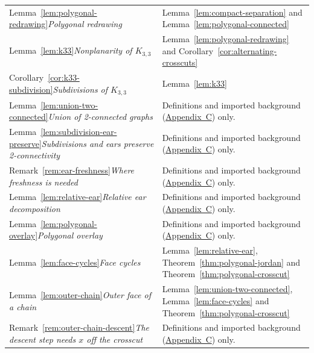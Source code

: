 \documentclass[11pt]{article}
\theoremstyle{mainplain}
\theoremstyle{mainroman}
\theoremstyle{definition}
\numberwithin{equation}{section}
\begin{document}
\begin{longtable}{@{}>{\raggedright\arraybackslash}p{}>{\raggedright\arraybackslash}p{}@{}}
Lemma~\ref{lem:polygonal-redrawing}\newline\emph{Polygonal redrawing} & Lemma~\ref{lem:compact-separation} and Lemma~\ref{lem:polygonal-connected} \\
Lemma~\ref{lem:k33}\newline\emph{Nonplanarity of $K_{3,3}$} & Lemma~\ref{lem:polygonal-redrawing} and Corollary~\ref{cor:alternating-crosscuts} \\
Corollary~\ref{cor:k33-subdivision}\newline\emph{Subdivisions of $K_{3,3}$} & Lemma~\ref{lem:k33} \\
Lemma~\ref{lem:union-two-connected}\newline\emph{Union of 2-connected graphs} & Definitions and imported background (\hyperref[app:background]{Appendix~C}) only. \\
Lemma~\ref{lem:subdivision-ear-preserve}\newline\emph{Subdivisions and ears preserve 2-connectivity} & Definitions and imported background (\hyperref[app:background]{Appendix~C}) only. \\
Remark~\ref{rem:ear-freshness}\newline\emph{Where freshness is needed} & Definitions and imported background (\hyperref[app:background]{Appendix~C}) only. \\
Lemma~\ref{lem:relative-ear}\newline\emph{Relative ear decomposition} & Definitions and imported background (\hyperref[app:background]{Appendix~C}) only. \\
Lemma~\ref{lem:polygonal-overlay}\newline\emph{Polygonal overlay} & Definitions and imported background (\hyperref[app:background]{Appendix~C}) only. \\
Lemma~\ref{lem:face-cycles}\newline\emph{Face cycles} & Lemma~\ref{lem:relative-ear}, Theorem~\ref{thm:polygonal-jordan} and Theorem~\ref{thm:polygonal-crosscut} \\
Lemma~\ref{lem:outer-chain}\newline\emph{Outer face of a chain} & Lemma~\ref{lem:union-two-connected}, Lemma~\ref{lem:face-cycles} and Theorem~\ref{thm:polygonal-crosscut} \\
Remark~\ref{rem:outer-chain-descent}\newline\emph{The descent step needs $x$ off the crosscut} & Definitions and imported background (\hyperref[app:background]{Appendix~C}) only. \\

\end{longtable}
\end{document}
